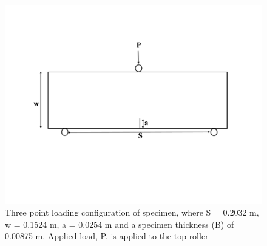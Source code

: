 \documentclass[12pt]{article}
\begin{document}
\begin{figure}[H]
	\centering
	\includegraphics[width=1\textwidth]{Geometry.png}
	\caption{Three point loading configuration of specimen, where S = 0.2032 m, w = 0.1524 m, a = 0.0254 m and a specimen thickness (B) of 0.00875 m. Applied load, P, is applied to the top roller}
	\label{fig:Geometry}
\end{figure}
\end{document}
